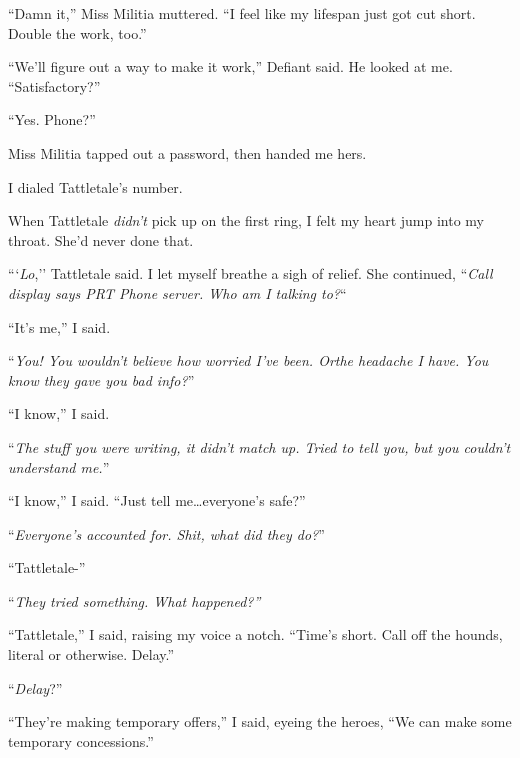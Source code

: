 ``Damn it,'' Miss Militia muttered.  ``I feel like my lifespan just got cut short.  Double the work, too.''



``We'll figure out a way to make it work,'' Defiant said.  He looked at me.  ``Satisfactory?''



``Yes.  Phone?''



Miss Militia tapped out a password, then handed me hers.



I dialed Tattletale's number.



When Tattletale \emph{didn't} pick up on the first ring, I felt my heart jump into my throat.  She'd never done that.



```\emph{Lo},'' Tattletale said.  I let myself breathe a sigh of relief.  She continued, ``\emph{Call display says PRT Phone server.  Who am I talking to?}``



``It's me,'' I said.



``\emph{You!  You wouldn't believe how worried I've been.  Or}\emph{the headache I have.  You know they gave you bad info?}''



``I know,'' I said.



``\emph{The stuff you were writing, it didn't match up.  Tried to tell you, but you couldn't understand me.}''



``I know,'' I said.  ``Just tell me\ldots everyone's safe?''



``\emph{Everyone's accounted for.  Shit, what did they do?}''



``Tattletale-''



``\emph{They tried something.  What happened?''}



``Tattletale,'' I said, raising my voice a notch.  ``Time's short.  Call off the hounds, literal or otherwise.  Delay.''



``\emph{Delay}?''



``They're making temporary offers,'' I said, eyeing the heroes, ``We can make some temporary concessions.''



